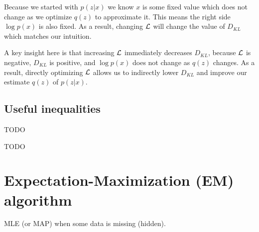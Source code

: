Because we started with $p(z|x)$ we know $x$ is some fixed value which does not change as we optimize $q(z)$ to approximate it. This means the right side $\log p(x)$ is also fixed. As a result, changing ${\mathcal{L}}$ will change the value of $D_{KL}$ which matches our intuition.

A key insight here is that increasing ${\mathcal{L}}$ immediately decreases $D_{KL}$, because ${\mathcal{L}}$ is negative, $D_{KL}$ is positive, and $\log p(x)$ does not change as $q(z)$ changes. As a result, directly optimizing ${\mathcal{L}}$ allows us to indirectly lower $D_{KL}$ and improve our estimate $q(z)$ of $p(z|x)$.

\subsection{Useful inequalities}

\begin{thm}
TODO
\end{thm}

\begin{thm}
TODO
\end{thm}

\begin{thm}
\end{thm}



\section{Expectation-Maximization (EM) algorithm}

MLE (or MAP) when some data is missing (hidden).

